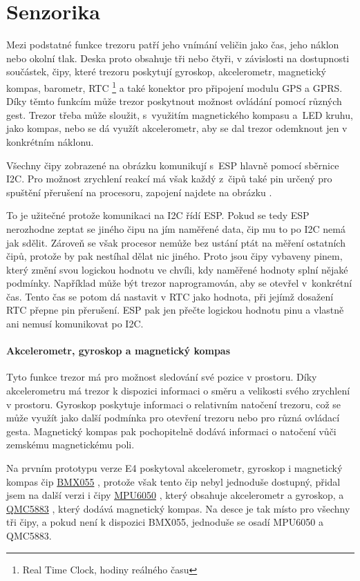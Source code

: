\section{Senzorika}
Mezi podstatné funkce trezoru patří jeho vnímání veličin jako čas, jeho náklon nebo okolní tlak.
Deska proto obsahuje tři nebo čtyři, v závislosti na dostupnosti součástek, čipy, které trezoru poskytují gyroskop, akcelerometr, magnetický kompas,
barometr, RTC \footnote{Real Time Clock, hodiny reálného času} a také konektor pro připojení modulu GPS a GPRS. Díky těmto funkcím může trezor poskytnout možnost ovládání 
pomocí různých gest. 
Trezor třeba může sloužit, s~využitím magnetického kompasu a~LED kruhu, jako kompas, nebo se dá využít akcelerometr, 
aby se dal trezor odemknout jen v konkrétním náklonu. 

Všechny čipy zobrazené na obrázku  komunikují s~ESP hlavně pomocí 
sběrnice I2C. Pro možnost zrychlení reakcí má však každý z~čipů také pin určený pro spuštění přerušení na procesoru, zapojení najdete na obrázku . 

To je užitečné protože komunikaci na I2C řídí ESP. Pokud se tedy ESP nerozhodne zeptat se jiného čipu na jím naměřené data, čip mu to po I2C nemá 
jak sdělit. Zároveň se však procesor nemůže bez ustání ptát na měření ostatních čipů, protože by pak nestíhal dělat nic jiného. Proto jsou čipy vybaveny 
pinem, který změní svou logickou hodnotu ve chvíli, kdy naměřené hodnoty splní nějaké podmínky. 
Například může být trezor naprogramován, aby se otevřel 
v~konkrétní čas. Tento čas se potom dá nastavit v RTC jako hodnota, při jejímž dosažení RTC přepne pin přerušení. ESP pak jen přečte logickou hodnotu 
pinu a vlastně ani nemusí komunikovat po I2C.

\paragraph{Akcelerometr, gyroskop a magnetický kompas}
Tyto funkce trezor má pro možnost sledování své pozice v prostoru. 
Díky akcelerometru má trezor k dispozici informaci o směru a velikosti svého zrychlení v prostoru.
Gyroskop poskytuje informaci o relativním natočení trezoru, což se může využít jako další podmínka pro otevření trezoru nebo pro různá ovládací gesta.
Magnetický kompas pak pochopitelně dodává informaci o natočení vůči zemskému magnetickému poli.

Na prvním prototypu verze E4 poskytoval akcelerometr, gyroskop i magnetický kompas čip \href{https://datasheet.lcsc.com/szlcsc/Bosch-Sensortec-BMX055_C94022.pdf}{BMX055} \parencite{bmx055},
protože však tento čip nebyl jednoduše dostupný, přidal jsem na další verzi i čipy \href{https://datasheet.lcsc.com/szlcsc/TDK-InvenSense-MPU-6050_C24112.pdf}{MPU6050} \parencite{mpu6050},
který obsahuje akcelerometr a gyroskop, a \href{https://datasheet.lcsc.com/szlcsc/QST-QMC5883L-TR_C192585.pdf}{QMC5883} \parencite{qmc5883}, který dodává magnetický kompas.
Na desce je tak místo pro všechny tři čipy, a pokud není k dispozici BMX055, jednoduše se osadí MPU6050 a QMC5883. 

